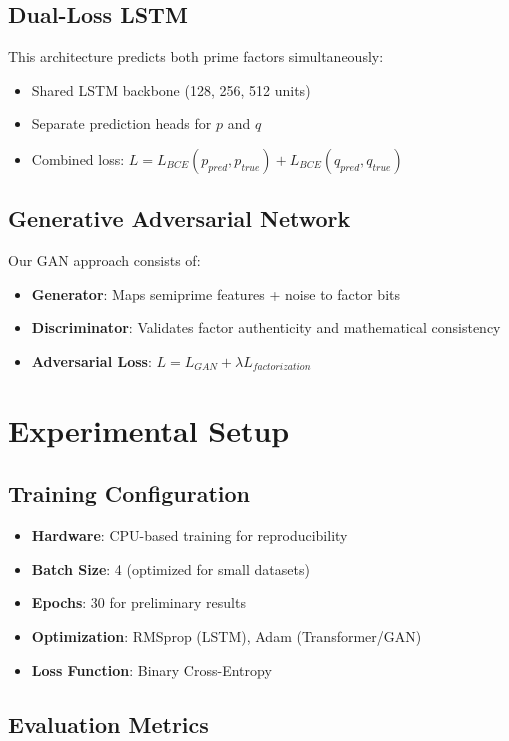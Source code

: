\documentclass[12pt]{article}
\begin{document}
\subsection{Dual-Loss LSTM}

This architecture predicts both prime factors simultaneously:
\begin{itemize}
\item Shared LSTM backbone (128, 256, 512 units)
\item Separate prediction heads for $p$ and $q$
\item Combined loss: $L = L_{BCE}(p_{pred}, p_{true}) + L_{BCE}(q_{pred}, q_{true})$
\end{itemize}

\subsection{Generative Adversarial Network}

Our GAN approach consists of:
\begin{itemize}
\item \textbf{Generator}: Maps semiprime features + noise to factor bits
\item \textbf{Discriminator}: Validates factor authenticity and mathematical consistency
\item \textbf{Adversarial Loss}: $L = L_{GAN} + \lambda L_{factorization}$
\end{itemize}

\section{Experimental Setup}

\subsection{Training Configuration}
\begin{itemize}
\item \textbf{Hardware}: CPU-based training for reproducibility
\item \textbf{Batch Size}: 4 (optimized for small datasets)
\item \textbf{Epochs}: 30 for preliminary results
\item \textbf{Optimization}: RMSprop (LSTM), Adam (Transformer/GAN)
\item \textbf{Loss Function}: Binary Cross-Entropy
\end{itemize}

\subsection{Evaluation Metrics}
\end{document}
